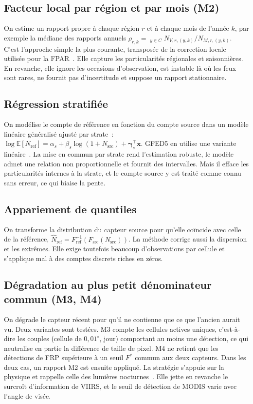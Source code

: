 \documentclass[11pt,a4paper]{article}
\DeclareMathOperator{\med}{m\acute{e}d}
\begin{document}
\subsection{Facteur local par région et par mois (M2)}
On estime un rapport propre à chaque région $r$ et à chaque mois de l'année $k$, par exemple la médiane des rapports annuels $\rho_{r,k} = \med_{y\in C} N_{V,r,(y,k)}/N_{M,r,(y,k)}$. C'est l'approche simple la plus courante, transposée de la correction locale utilisée pour la FPAR~\cite{seguini2026}. Elle capture les particularités régionales et saisonnières. En revanche, elle ignore les occasions d'observation, est instable là où les feux sont rares, ne fournit pas d'incertitude et suppose un rapport stationnaire.

\subsection{Régression stratifiée}
On modélise le compte de référence en fonction du compte source dans un modèle linéaire généralisé ajusté par strate~: $\log \mathbb{E}[N_{\text{ref}}] = \alpha_s + \beta_s \log(1 + N_{\text{src}}) + \boldsymbol\gamma_s^\top \mathbf{x}$. GFED5 en utilise une variante linéaire~\cite{chen2023}. La mise en commun par strate rend l'estimation robuste, le modèle admet une relation non proportionnelle et fournit des intervalles. Mais il efface les particularités internes à la strate, et le compte source y est traité comme connu sans erreur, ce qui biaise la pente.

\subsection{Appariement de quantiles}
On transforme la distribution du capteur source pour qu'elle coïncide avec celle de la référence, $\hat N_{\text{ref}} = F_{\text{ref}}^{-1}(F_{\text{src}}(N_{\text{src}}))$. La méthode corrige aussi la dispersion et les extrêmes. Elle exige toutefois beaucoup d'observations par cellule et s'applique mal à des comptes discrets riches en zéros.

\subsection{Dégradation au plus petit dénominateur commun (M3, M4)}
On dégrade le capteur récent pour qu'il ne contienne que ce que l'ancien aurait vu. Deux variantes sont testées. M3 compte les cellules actives uniques, c'est-à-dire les couples (cellule de $0{,}01^\circ$, jour) comportant au moins une détection, ce qui neutralise en partie la différence de taille de pixel. M4 ne retient que les détections de FRP supérieure à un seuil $F^\ast$ commun aux deux capteurs. Dans les deux cas, un rapport M2 est ensuite appliqué. La stratégie s'appuie sur la physique et rappelle celle des lumières nocturnes~\cite{li2020}. Elle jette en revanche le surcroît d'information de VIIRS, et le seuil de détection de MODIS varie avec l'angle de visée.
\end{document}
